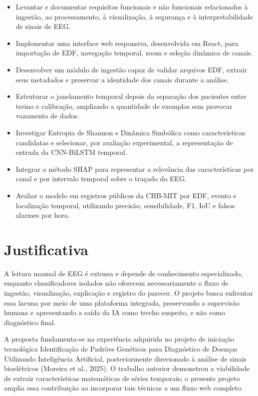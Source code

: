 \begin{itemize}[leftmargin=1.25cm,itemsep=0pt,topsep=0pt]
\item Levantar e documentar requisitos funcionais e não funcionais relacionados à ingestão, ao processamento, à visualização, à segurança e à interpretabilidade de sinais de EEG.
\item Implementar uma interface web responsiva, desenvolvida em React, para importação de EDF, navegação temporal, zoom e seleção dinâmica de canais.
\item Desenvolver um módulo de ingestão capaz de validar arquivos EDF, extrair seus metadados e preservar a identidade dos canais durante a análise.
\item Estruturar o janelamento temporal depois da separação dos pacientes entre treino e calibração, ampliando a quantidade de exemplos sem provocar vazamento de dados.
\item Investigar Entropia de Shannon e Dinâmica Simbólica como características candidatas e selecionar, por avaliação experimental, a representação de entrada da CNN-BiLSTM temporal.
\item Integrar o método SHAP para representar a relevância das características por canal e por intervalo temporal sobre o traçado do EEG.
\item Avaliar o modelo em registros públicos da CHB-MIT por EDF, evento e localização temporal, utilizando precisão, sensibilidade, F1, IoU e falsos alarmes por hora.
\end{itemize}
\section{Justificativa}
A leitura manual de EEG é extensa e depende de conhecimento especializado, enquanto classificadores isolados não oferecem necessariamente o fluxo de ingestão, visualização, explicação e registro do parecer. O projeto busca enfrentar essa lacuna por meio de uma plataforma integrada, preservando a supervisão humana e apresentando a saída da IA como trecho suspeito, e não como diagnóstico final.

A proposta fundamenta-se na experiência adquirida no projeto de iniciação tecnológica Identificação de Padrões Genéticos para Diagnóstico de Doenças Utilizando Inteligência Artificial, posteriormente direcionado à análise de sinais bioelétricos (Moreira et al., 2025). O trabalho anterior demonstrou a viabilidade de extrair características matemáticas de séries temporais; o presente projeto amplia essa contribuição ao incorporar tais técnicas a um fluxo web completo.

